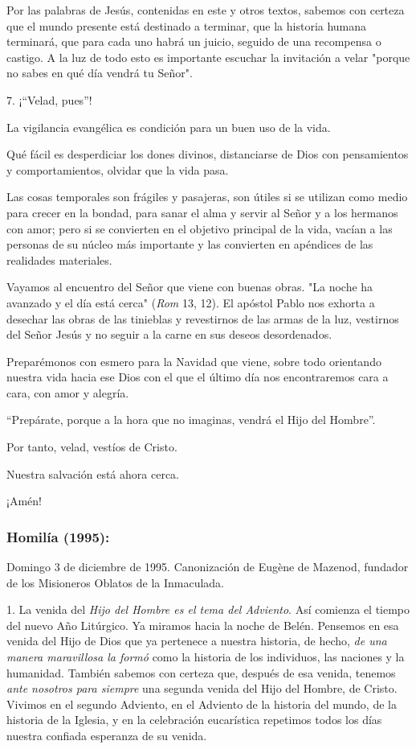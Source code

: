 \begin{body}
\begin{body}
Por las palabras de Jesús, contenidas en este y otros textos, sabemos con certeza que el mundo presente está destinado a terminar, que la historia humana terminará, que para cada uno habrá un juicio, seguido de una recompensa o castigo. A la luz de todo esto es importante escuchar la invitación a velar "porque no sabes en qué día vendrá tu Señor".

7. ¡``Velad, pues''!

La vigilancia evangélica es condición para un buen uso de la vida.

Qué fácil es desperdiciar los dones divinos, distanciarse de Dios con pensamientos y comportamientos, olvidar que la vida pasa.

Las cosas temporales son frágiles y pasajeras, son útiles si se utilizan como medio para crecer en la bondad, para sanar el alma y servir al Señor y a los hermanos con amor; pero si se convierten en el objetivo principal de la vida, vacían a las personas de su núcleo más importante y las convierten en apéndices de las realidades materiales.

Vayamos al encuentro del Señor que viene con buenas obras. "La noche ha avanzado y el día está cerca" (\emph{Rom} 13, 12). El apóstol Pablo nos exhorta a desechar las obras de las tinieblas y revestirnos de las armas de la luz, vestirnos del Señor Jesús y no seguir a la carne en sus deseos desordenados.

Preparémonos con esmero para la Navidad que viene, sobre todo orientando nuestra vida hacia ese Dios con el que el último día nos encontraremos cara a cara, con amor y alegría.

``Prepárate, porque a la hora que no imaginas, vendrá el Hijo del Hombre''.

Por tanto, velad, vestíos de Cristo.

Nuestra salvación está ahora cerca.

¡Amén!
\end{body} 
	
\subsubsection{Homilía (1995): }

Domingo 3 de diciembre de 1995. Canonización de Eugène de Mazenod, fundador de los Misioneros Oblatos de la Inmaculada.

\begin{body} 
1. La venida del \emph{Hijo del Hombre es el tema del Adviento}. Así comienza el tiempo del nuevo Año Litúrgico. Ya miramos hacia la noche de Belén. Pensemos en esa venida del Hijo de Dios que ya pertenece a nuestra historia, de hecho, \emph{de una manera maravillosa la formó} como la historia de los individuos, las naciones y la humanidad. También sabemos con certeza que, después de esa venida, tenemos \emph{ante nosotros para siempre} una segunda venida del Hijo del Hombre, de Cristo. Vivimos en el segundo Adviento, en el Adviento de la historia del mundo, de la historia de la Iglesia, y en la celebración eucarística repetimos todos los días nuestra confiada esperanza de su venida.


\end{body}
\end{body}
